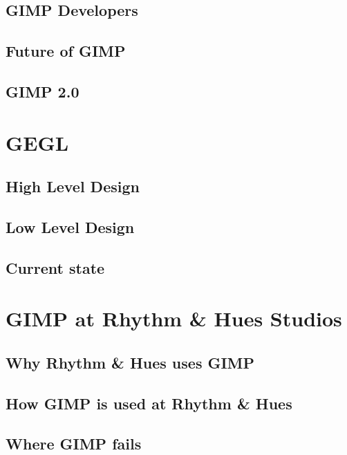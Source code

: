 \documentclass{report}
\begin{document}
\section{GIMP Developers}
\section{Future of GIMP} 

\section{GIMP 2.0}



\chapter{GEGL}

\section{High Level Design}

\section{Low Level Design}

\section{Current state}


\chapter{GIMP at Rhythm \& Hues Studios}

\section{Why Rhythm \& Hues uses GIMP}

\section{How GIMP is used at Rhythm \& Hues}

\section{Where GIMP fails}

\end{document}
